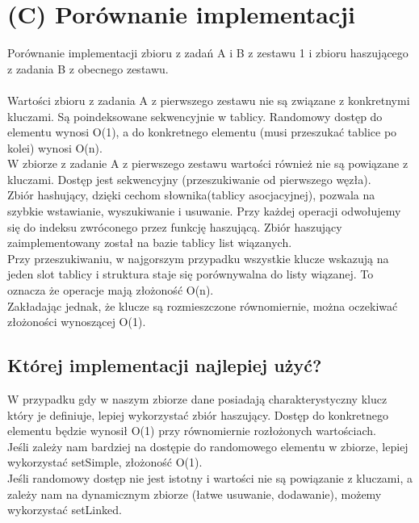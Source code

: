 \documentclass{article}
\begin{document}
\section*{(C) Porównanie implementacji}
Porównanie implementacji zbioru z zadań A i B z zestawu 1 i zbioru haszującego z zadania B z obecnego zestawu.\\\\
Wartości zbioru z zadania A z pierwszego zestawu nie są związane z konkretnymi kluczami. Są poindeksowane sekwencyjnie w tablicy. Randomowy dostęp do elementu wynosi O(1), a do konkretnego elementu (musi przeszukać tablice po kolei) wynosi O(n).\\

W zbiorze z zadanie A z pierwszego zestawu wartości również nie są powiązane z kluczami. Dostęp jest sekwencyjny (przeszukiwanie od pierwszego węzła).\\

Zbiór hashujący, dzięki cechom słownika(tablicy asocjacyjnej), pozwala na szybkie wstawianie, wyszukiwanie i usuwanie. Przy każdej operacji odwołujemy się do indeksu zwróconego przez funkcję haszującą. Zbiór haszujący zaimplementowany został na bazie tablicy list wiązanych.\\ Przy przeszukiwaniu, w najgorszym przypadku wszystkie klucze wskazują na jeden slot tablicy i struktura staje się porównywalna do listy wiązanej. To oznacza że operacje mają złożoność O(n).\\ 
Zakładając jednak, że klucze są rozmieszczone równomiernie, można oczekiwać złożoności wynoszącej O(1).

\subsection*{Której implementacji najlepiej użyć?}
W przypadku gdy w naszym zbiorze dane posiadają charakterystyczny klucz który je definiuje, lepiej wykorzystać zbiór haszujący. Dostęp do konkretnego elementu będzie wynosił O(1) przy równomiernie rozłożonych wartościach.\\ 

Jeśli zależy nam bardziej na dostępie do randomowego elementu w zbiorze, lepiej wykorzystać setSimple, złożoność O(1).\\

Jeśli randomowy dostęp nie jest istotny i wartości nie są powiązanie z kluczami, a zależy nam na dynamicznym zbiorze (łatwe usuwanie, dodawanie), możemy wykorzystać setLinked.
\cite{}
\end{document}
